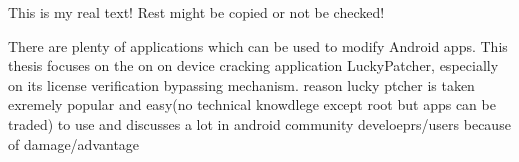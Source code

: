 This is my real text! Rest might be copied or not be checked!

There are plenty of applications which can be used to modify Android apps. This thesis focuses on the on on device cracking application LuckyPatcher, especially on its license verification bypassing mechanism.
reason lucky ptcher is taken exremely popular and easy(no technical knowdlege except root but apps can be traded) to use and discusses a lot in android community develoeprs/users because of damage/advantage
